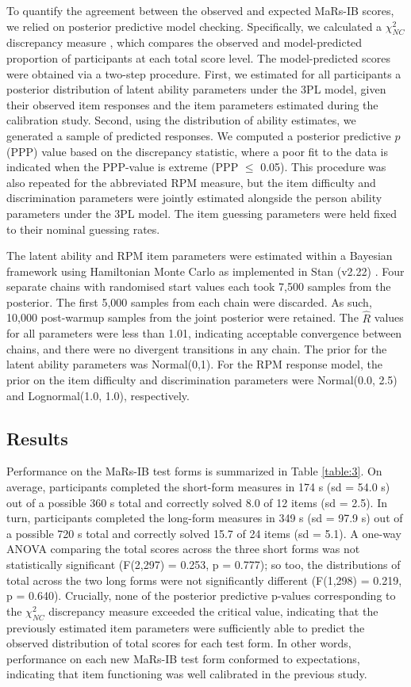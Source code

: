 \documentclass[a4paper,man,natbib,noextraspace]{apa6}
\begin{document}
To quantify the agreement between the observed and expected MaRs-IB scores, we relied on posterior predictive model checking. Specifically, we calculated a $\chi^2_{NC}$ discrepancy measure \citep{sinharay2006posterior}, which compares the observed and model-predicted proportion of participants at each total score level. The model-predicted scores were obtained via a two-step procedure. First, we estimated for all participants a posterior distribution of latent ability parameters under the 3PL model, given their observed item responses and the item parameters estimated during the calibration study. Second, using the distribution of ability estimates, we generated a sample of predicted responses. We computed a posterior predictive $p$ (PPP) value based on the discrepancy statistic, where a poor fit to the data is indicated when the PPP-value is extreme (PPP $\leq$ 0.05). This procedure was also repeated for the abbreviated RPM measure, but the item difficulty and discrimination parameters were jointly estimated alongside the person ability parameters under the 3PL model. The item guessing parameters were held fixed to their nominal guessing rates.

The latent ability and RPM item parameters were estimated within a Bayesian framework using Hamiltonian Monte Carlo as implemented in Stan (v2.22) \citep{carpenter2017stan}. Four separate chains with randomised start values each took 7,500 samples from the posterior. The first 5,000 samples from each chain were discarded. As such, 10,000 post-warmup samples from the joint posterior were retained. The $\hat{R}$ values for all parameters were less than 1.01, indicating acceptable convergence between chains, and there were no divergent transitions in any chain. The prior for the latent ability parameters was Normal(0,1). For the RPM response model, the prior on the item difficulty and discrimination parameters were Normal(0.0, 2.5) and Lognormal(1.0, 1.0), respectively. 

\subsection{Results}

Performance on the MaRs-IB test forms is summarized in Table \ref{table:3}. On average, participants completed the short-form measures in 174 s (sd = 54.0 s) out of a possible 360 s total and correctly solved 8.0 of 12 items (sd = 2.5). In turn, participants completed the long-form measures in 349 s (sd = 97.9 s) out of a possible 720 s total and correctly solved 15.7 of 24 items (sd = 5.1). A one-way ANOVA comparing the total scores across the three short forms was not statistically significant (F(2,297) = 0.253, p = 0.777); so too, the distributions of total across the two long forms were not significantly different (F(1,298) = 0.219, p = 0.640). Crucially, none of the posterior predictive p-values corresponding to the $\chi^2_{NC}$ discrepancy measure exceeded the critical value, indicating that the previously estimated item parameters were sufficiently able to predict the observed distribution of total scores for each test form. In other words, performance on each new MaRs-IB test form conformed to expectations, indicating that item functioning was well calibrated in the previous study.
\end{document}
